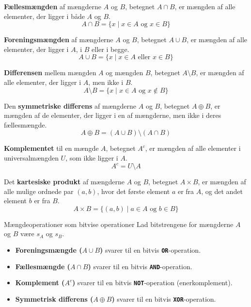\begin{definition}[Fællesmængde]
    \textbf{Fællesmængden} af mængderne $A$ og $B$, betegnet $A \cap B$, er mængden af alle elementer, der ligger i både $A$ og $B$.
    \[ A \cap B = \{ x \mid x \in A \text{ og } x \in B \} \]
\end{definition}

\begin{definition}[Foreningsmængde]
    \textbf{Foreningsmængden} af mængderne $A$ og $B$, betegnet $A \cup B$, er mængden af alle elementer, der ligger i $A$, i $B$ eller i begge.
    \[ A \cup B = \{ x \mid x \in A \text{ eller } x \in B \} \]
\end{definition}

\begin{definition}[Mængdedifferens]
    \textbf{Differensen} mellem mængden $A$ og mængden $B$, betegnet $A \setminus B$, er mængden af alle elementer, der ligger i $A$, men ikke i $B$.
    \[ A \setminus B = \{ x \mid x \in A \text{ og } x \notin B \} \]
\end{definition}

\begin{definition}
    Den \textbf{symmetriske differens} af mængderne $A$ og $B$, betegnet $A \oplus B$, er mængden af de elementer, der ligger i en af mængderne, men ikke i deres fællesmængde.
    \[ A \oplus B = (A \cup B) \setminus (A \cap B) \]
\end{definition}

\begin{definition}[Komplement]
    \textbf{Komplementet} til en mængde $A$, betegnet $A^c$, er mængden af alle elementer i universalmængden $U$, som ikke ligger i $A$.
    \[ A^c = U \setminus A \]
\end{definition}

\begin{definition}
    Det \textbf{kartesiske produkt} af mængderne $A$ og $B$, betegnet $A \times B$, er mængden af alle mulige ordnede par $(a, b)$, hvor det første element $a$ er fra $A$, og det andet element $b$ er fra $B$.
    \[ A \times B = \{ (a, b) \mid a \in A \text{ og } b \in B \} \]
\end{definition}

\begin{custombox}{Mængdeoperationer som bitvise operationer}
    Lad bitstrengene for mængderne $A$ og $B$ være $s_A$ og $s_B$.
    \begin{itemize}
        \item \textbf{Foreningsmængde ($A \cup B$)} svarer til en bitvis \textbf{\texttt{OR}}-operation.
        \item \textbf{Fællesmængde ($A \cap B$)} svarer til en bitvis \textbf{\texttt{AND}}-operation.
        \item \textbf{Komplement ($A^c$)} svarer til en bitvis \textbf{\texttt{NOT}}-operation (enerkomplement).
        \item \textbf{Symmetrisk differens ($A \oplus B$)} svarer til en bitvis \textbf{\texttt{XOR}}-operation.
    \end{itemize}
\end{custombox}

